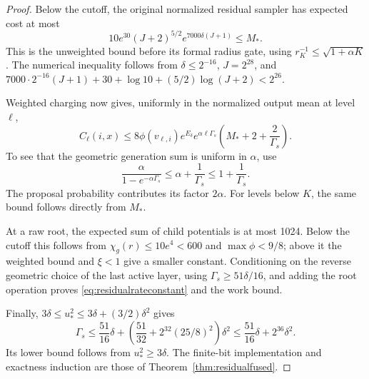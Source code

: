 \begin{proof}
Below the cutoff, the original normalized residual sampler has
expected cost at most
\[
10e^{30}(J+2)^{5/2}e^{7000\delta(J+1)}\le M_*.
\]
This is the unweighted bound before its formal radius gate,
using $r_K^{-1}\le\sqrt{1+\alpha K}$.
The numerical inequality follows from $\delta\le2^{-16}$,
$J=2^{28}$, and
$7000\cdot2^{-16}(J+1)+30+\log10+(5/2)\log(J+2)<2^{26}$.

Weighted charging now gives, uniformly in the normalized output
mean at level $\ell$,
\[
C_\ell(i,x)\le
8\phi(v_{\ell,i})e^{E_\delta}e^{\alpha\ell\Gamma_s}
\left(M_*+2+\frac{2}{\Gamma_s}\right).
\]
To see that the geometric generation sum is uniform in
$\alpha$, use
\[
\frac{\alpha}{1-e^{-\alpha\Gamma_s}}
\le\alpha+\frac1{\Gamma_s}\le1+\frac1{\Gamma_s}.
\]
The proposal probability contributes its factor $2\alpha$.
For levels below $K$, the same bound follows directly from $M_*$.

At a raw root, the expected sum of child potentials is at most
1024. Below the cutoff this follows from
$\chi_g(r)\le10e^4<600$ and $\max\phi<9/8$;
above it the weighted bound and $\xi<1$ give a smaller constant.
Conditioning on the reverse geometric choice of the last active
layer, using $\Gamma_s\ge51\delta/16$, and adding the root
operation proves \eqref{eq:residualrateconstant} and
the work bound.

Finally, $3\delta\le u_*^2\le3\delta+(3/2)\delta^2$ gives
\[
\Gamma_s\le\frac{51}{16}\delta+
 \left(\frac{51}{32}+2^{32}(25/8)^2\right)\delta^2
\le\frac{51}{16}\delta+2^{36}\delta^2.
\]
Its lower bound follows from $u_*^2\ge3\delta$.
The finite-bit implementation and exactness induction are those
of Theorem~\ref{thm:residualfused}.
\end{proof}
